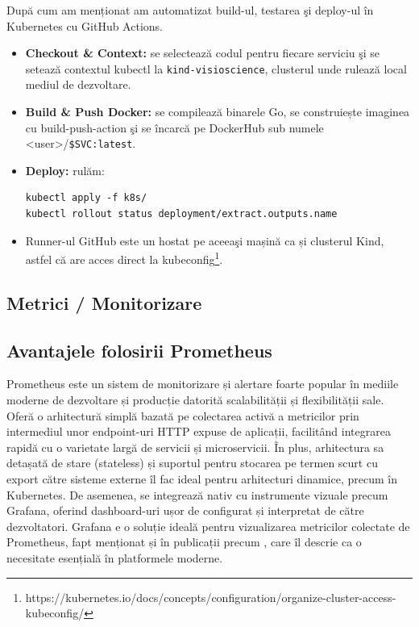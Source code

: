 După cum am menționat am automatizat build-ul, testarea şi deploy-ul în Kubernetes cu GitHub Actions.
\begin{itemize}
  \item \textbf{Checkout \& Context:} se selectează codul pentru fiecare serviciu şi se setează contextul kubectl 
  la \texttt{kind-visioscience}, clusterul unde rulează local mediul de dezvoltare.
  \item \textbf{Build \& Push Docker:} se compilează binarele Go, se construiește imaginea cu build-push-action
  şi se încarcă pe DockerHub sub numele <user>/\texttt{\$SVC:latest}.
  \item \textbf{Deploy:} rulăm:
    \begin{lstlisting}[style=yamlstyle]
kubectl apply -f k8s/
kubectl rollout status deployment/extract.outputs.name
    \end{lstlisting}
  \item Runner-ul GitHub este un hostat pe aceeaşi mașină ca și clusterul Kind, astfel că are acces direct la 
kubeconfig\footnote{https://kubernetes.io/docs/concepts/configuration/organize-cluster-access-kubeconfig/}.
\end{itemize}

\subsection{Metrici / Monitorizare}

\subsection{Avantajele folosirii Prometheus}

Prometheus este un sistem de monitorizare și alertare foarte popular în mediile moderne de dezvoltare și producție
datorită scalabilității și flexibilității sale. Oferă o arhitectură simplă bazată pe
colectarea activă a metricilor prin intermediul unor endpoint-uri HTTP expuse de aplicații,
facilitând integrarea rapidă cu o varietate largă de
servicii și microservicii. În plus, arhitectura sa detașată de stare (stateless) și suportul
pentru stocarea pe termen scurt cu export către sisteme
externe îl fac ideal pentru arhitecturi dinamice, precum în Kubernetes. De asemenea, se integrează
nativ cu instrumente vizuale precum Grafana, oferind dashboard-uri ușor de configurat
și interpretat de către dezvoltatori. Grafana e o soluție ideală pentru vizualizarea metricilor
colectate de Prometheus, fapt menționat și în publicații precum \cite{grafanaObs}, care îl descrie 
ca o necesitate esențială în platformele moderne.

